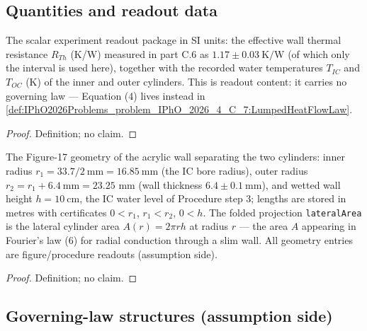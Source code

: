 \subsection*{Quantities and readout data}

\begin{definition}
\label{def:IPhO2026Problems_problem_IPhO_2026_4_C_7:ThermalExperimentData}
The scalar experiment readout package in SI units: the effective wall
thermal resistance $R_{Th}$ (K/W) measured in part C.6 as
$1.17 \pm 0.03\ \mathrm{K/W}$ (of which only the interval is used here),
together with the recorded water temperatures $T_{IC}$ and $T_{OC}$ (K) of
the inner and outer cylinders. This is readout content: it carries no
governing law --- Equation (4) lives instead in
\cref{def:IPhO2026Problems_problem_IPhO_2026_4_C_7:LumpedHeatFlowLaw}.
\end{definition}
\begin{proof}
Definition; no claim.
\end{proof}

\begin{definition}
\label{def:IPhO2026Problems_problem_IPhO_2026_4_C_7:CylindricalWallGeometry}
The Figure-17 geometry of the acrylic wall separating the two cylinders:
inner radius $r_1 = 33.7/2\ \mathrm{mm} = 16.85\ \mathrm{mm}$ (the IC
bore radius), outer radius $r_2 = r_1 + 6.4\ \mathrm{mm} = 23.25$
mm (wall thickness $6.4 \pm 0.1\ \mathrm{mm}$), and wetted
wall height $h = 10\ \mathrm{cm}$, the IC water level of Procedure
step 3; lengths are stored in metres with certificates $0 < r_1$,
$r_1 < r_2$, $0 < h$. The folded projection \texttt{lateralArea} is the
lateral cylinder area $A(r) = 2\pi r h$ at radius $r$ --- the area $A$
appearing in Fourier's law (6) for radial conduction through a slim wall.
All geometry entries are figure/procedure readouts (assumption side).
\end{definition}
\begin{proof}
Definition; no claim.
\end{proof}

\subsection*{Governing-law structures (assumption side)}

